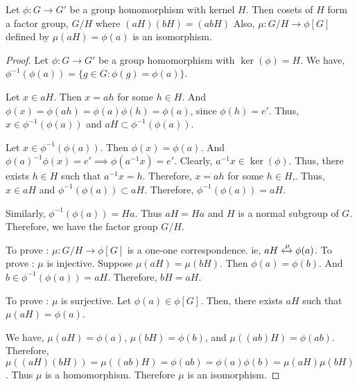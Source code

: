 \begin{theorem}
	Let $\phi : G \to G'$ be a group homomorphism with kernel $H$.
	Then cosets of $H$ form a factor group, $G/H$ where $(aH)(bH) = (abH)$ Also, $\mu : G/H \to \phi[G]$ defined by $\mu(aH) = \phi(a)$ is an isomorphism.
\end{theorem}
\begin{proof}
	Let $\phi : G \to G'$ be a group homomorphism with $\ker(\phi) = H$.
	We have, $\phi^{-1}(\phi(a)) = \{ g \in G : \phi(g) = \phi(a) \}$.

	Let $x \in aH$.
	Then $x = ah$ for some $h \in H$.
	And $\phi(x) = \phi(ah) = \phi(a)\phi(h) = \phi(a)$, since $\phi(h) = e'$.
	Thus, $x \in \phi^{-1}(\phi(a))$ and $aH \subset \phi^{-1}(\phi(a))$.

	Let $x \in \phi^{-1}(\phi(a))$.
	Then $\phi(x) = \phi(a)$.
	And $\phi(a)^{-1} \phi(x) = e' \implies \phi(a^{-1}x) = e'$.
	Clearly, $a^{-1}x \in \ker(\phi)$.
	Thus, there exists $h \in H$ such that $a^{-1}x = h$.
	Therefore, $x = ah$ for some $h \in H$,.
	Thus, $x \in aH$ and $\phi^{-1}(\phi(a)) \subset aH$.
	Therefore, $\phi^{-1}(\phi(a)) = aH$.
	
	Similarly, $\phi^{-1}(\phi(a)) = Ha$.
	Thus $aH = Ha$ and $H$ is a normal subgroup of $G$.
	Therefore, we have the factor group $G/H$.

	To prove : $\mu : G/H \to \phi[G]$ is a one-one correspondence.
	ie, $aH \xleftrightarrow{\mu} \phi(a)$.
	To prove : $\mu$ is injective.
	Suppose $\mu(aH) = \mu(bH)$. Then $\phi(a) = \phi(b)$.
	And $b \in \phi^{-1}(\phi(a)) = aH$. Therefore, $bH = aH$.

	To prove : $\mu$ is surjective.
	Let $\phi(a) \in \phi[G]$.
	Then, there exists $aH$ such that  $\mu(aH) = \phi(a)$.

	We have, $\mu(aH) = \phi(a)$, $\mu(bH) = \phi(b)$, and $\mu((ab)H)  = \phi(ab)$.\\
	Therefore, $\mu((aH)(bH)) = \mu((ab)H) = \phi(ab) = \phi(a)\phi(b) = \mu(aH)\mu(bH)$.
	Thus $\mu$ is a homomorphism.
	Therefore $\mu$ is an isomorphism.
\end{proof}

